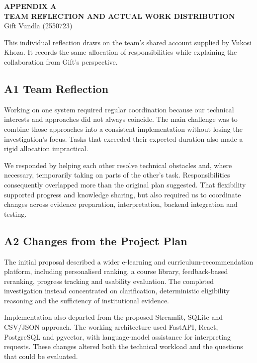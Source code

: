 

\thispagestyle{empty}\pagestyle{empty}
\begin{center}
\textbf{APPENDIX A}\\[10pt]
\textbf{TEAM REFLECTION AND ACTUAL WORK DISTRIBUTION}\\[6pt]
Gift Vundla (2550723)
\end{center}
\noindent This individual reflection draws on the team's shared account supplied by Vukosi Khoza. It records the same allocation of responsibilities while explaining the collaboration from Gift's perspective.

\subsection*{A1 Team Reflection}
Working on one system required regular coordination because our technical interests and approaches did not always coincide. The main challenge was to combine those approaches into a consistent implementation without losing the investigation's focus. Tasks that exceeded their expected duration also made a rigid allocation impractical.

We responded by helping each other resolve technical obstacles and, where necessary, temporarily taking on parts of the other's task. Responsibilities consequently overlapped more than the original plan suggested. That flexibility supported progress and knowledge sharing, but also required us to coordinate changes across evidence preparation, interpretation, backend integration and testing.

\subsection*{A2 Changes from the Project Plan}
The initial proposal described a wider e-learning and curriculum-recommendation platform, including personalised ranking, a course library, feedback-based reranking, progress tracking and usability evaluation. The completed investigation instead concentrated on clarification, deterministic eligibility reasoning and the sufficiency of institutional evidence.

Implementation also departed from the proposed Streamlit, SQLite and CSV/JSON approach. The working architecture used FastAPI, React, PostgreSQL and pgvector, with language-model assistance for interpreting requests. These changes altered both the technical workload and the questions that could be evaluated.

